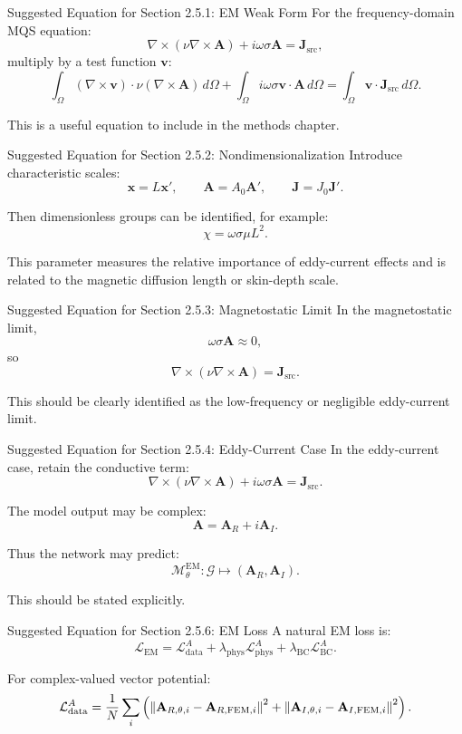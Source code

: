 \documentclass[aspectratio=169]{beamer}
\begin{document}
\begin{frame}{Suggested Equation for Section 2.5.1: EM Weak Form}
For the frequency-domain MQS equation:
\[
\nabla\times(\nu\nabla\times \mathbf{A})
+
i\omega\sigma\mathbf{A}
=
\mathbf{J}_{\mathrm{src}},
\]
multiply by a test function \(\mathbf{v}\):
\[
\int_\Omega
(\nabla\times \mathbf{v})\cdot
\nu(\nabla\times \mathbf{A})\,d\Omega
+
\int_\Omega
i\omega\sigma \mathbf{v}\cdot \mathbf{A}\,d\Omega
=
\int_\Omega
\mathbf{v}\cdot\mathbf{J}_{\mathrm{src}}\,d\Omega.
\]

This is a useful equation to include in the methods chapter.
\end{frame}

\begin{frame}{Suggested Equation for Section 2.5.2: Nondimensionalization}
Introduce characteristic scales:
\[
\mathbf{x}=L\mathbf{x}',
\qquad
\mathbf{A}=A_0\mathbf{A}',
\qquad
\mathbf{J}=J_0\mathbf{J}'.
\]

Then dimensionless groups can be identified, for example:
\[
\chi
=
\omega\sigma\mu L^2.
\]

This parameter measures the relative importance of eddy-current effects and is related to the magnetic diffusion length or skin-depth scale.
\end{frame}

\begin{frame}{Suggested Equation for Section 2.5.3: Magnetostatic Limit}
In the magnetostatic limit,
\[
\omega\sigma\mathbf{A}\approx 0,
\]
so
\[
\nabla\times(\nu\nabla\times\mathbf{A})
=
\mathbf{J}_{\mathrm{src}}.
\]

This should be clearly identified as the low-frequency or negligible eddy-current limit.
\end{frame}

\begin{frame}{Suggested Equation for Section 2.5.4: Eddy-Current Case}
In the eddy-current case, retain the conductive term:
\[
\nabla\times(\nu\nabla\times\mathbf{A})
+
i\omega\sigma\mathbf{A}
=
\mathbf{J}_{\mathrm{src}}.
\]

The model output may be complex:
\[
\mathbf{A}=\mathbf{A}_R+i\mathbf{A}_I.
\]

Thus the network may predict:
\[
\mathcal{M}_{\theta}^{\mathrm{EM}}:
\mathcal{G}\mapsto
(\mathbf{A}_R,\mathbf{A}_I).
\]

This should be stated explicitly.
\end{frame}

\begin{frame}{Suggested Equation for Section 2.5.6: EM Loss}
A natural EM loss is:
\[
\mathcal{L}_{\mathrm{EM}}
=
\mathcal{L}_{\mathrm{data}}^{A}
+
\lambda_{\mathrm{phys}}\mathcal{L}_{\mathrm{phys}}^{A}
+
\lambda_{\mathrm{BC}}\mathcal{L}_{\mathrm{BC}}^{A}.
\]

For complex-valued vector potential:
\[
\mathcal{L}_{\mathrm{data}}^{A}
=
\frac{1}{N}\sum_i
\left(
\norm{\mathbf{A}_{R,\theta,i}-\mathbf{A}_{R,\mathrm{FEM},i}}^2
+
\norm{\mathbf{A}_{I,\theta,i}-\mathbf{A}_{I,\mathrm{FEM},i}}^2
\right).
\]
\end{frame}
\end{document}

